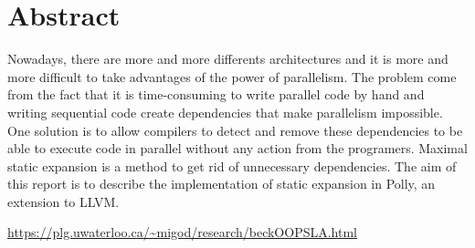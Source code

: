 \begingroup
\let\clearpage\relax
\let\cleardoublepage\relax
\let\cleardoublepage\relax

\chapter*{Abstract}
Nowadays, there are more and more differents architectures and it is more and more difficult to take advantages of the power of parallelism. The problem come from the fact that it is time-consuming to write parallel code by hand and writing sequential code create dependencies that make parallelism impossible. One solution is to allow compilers to detect and remove these dependencies to be able to execute code in parallel without any action from the programers. Maximal static expansion is a method to get rid of unnecessary dependencies. The aim of this report is to describe the implementation of static expansion in Polly, an extension to LLVM.

\begin{center}
\url{https://plg.uwaterloo.ca/~migod/research/beckOOPSLA.html}
\end{center}

\vfill

\endgroup			

\vfill